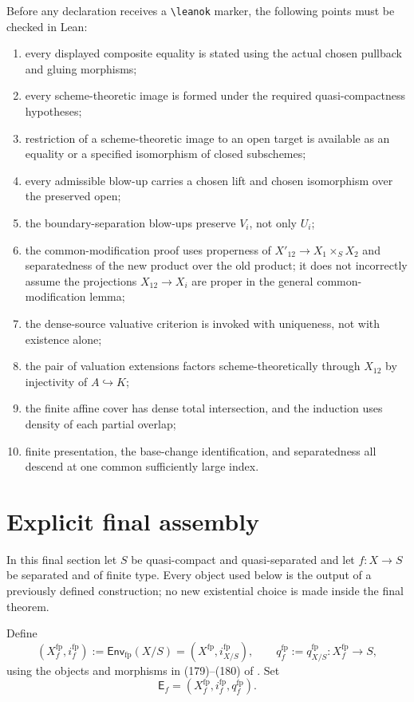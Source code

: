 Before any declaration receives a \verb|\leanok| marker, the following points
must be checked in Lean:
\begin{enumerate}
  \item every displayed composite equality is stated using the actual chosen
    pullback and gluing morphisms;
  \item every scheme-theoretic image is formed under the required
    quasi-compactness hypotheses;
  \item restriction of a scheme-theoretic image to an open target is available
    as an equality or a specified isomorphism of closed subschemes;
  \item every admissible blow-up carries a chosen lift and chosen isomorphism
    over the preserved open;
  \item the boundary-separation blow-ups preserve $V_i$, not only $U_i$;
  \item the common-modification proof uses properness of
    $X'_{12}\to X_1\times_SX_2$ and separatedness of the new product over the
    old product; it does not incorrectly assume the projections
    $X_{12}\to X_i$ are proper in the general common-modification lemma;
  \item the dense-source valuative criterion is invoked with uniqueness, not
    with existence alone;
  \item the pair of valuation extensions factors scheme-theoretically through
    $X_{12}$ by injectivity of $A\hookrightarrow K$;
  \item the finite affine cover has dense total intersection, and the induction
    uses density of each partial overlap;
  \item finite presentation, the base-change identification, and separatedness
    all descend at one common sufficiently large index.
\end{enumerate}

\section{Explicit final assembly}

In this final section let $S$ be quasi-compact and quasi-separated and let
$f\colon X\to S$ be separated and of finite type.  Every object used below is
the output of a previously defined construction; no new existential choice is
made inside the final theorem.

\begin{definition}
  \label{def:nagata-final-fp-envelope}
  \checked{}

  Define
  \[
    (X_f^{\mathrm{fp}},i_f^{\mathrm{fp}})
      :=\mathsf{Env}_{\mathrm{fp}}(X/S)
      =(X^{\mathrm{fp}},i^{\mathrm{fp}}_{X/S}),
    \qquad
    q_f^{\mathrm{fp}}
      :=q^{\mathrm{fp}}_{X/S}
      \colon X_f^{\mathrm{fp}}\longrightarrow S,
  \]
  using the objects and morphisms in (179)--(180) of
  .  Set
  \[
    \mathsf E_f
      =(X_f^{\mathrm{fp}},i_f^{\mathrm{fp}},q_f^{\mathrm{fp}}).
  \]
\end{definition}

